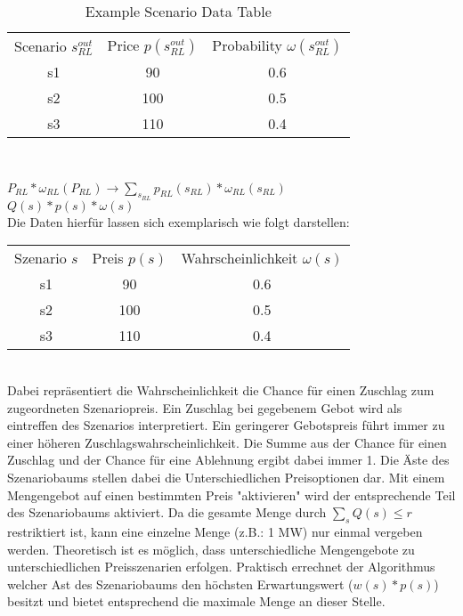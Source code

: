 


\begin{table}
	\begin{tabular}{c|c|c}
		Scenario $s^{out}_{RL}$ & Price $p(s^{out}_{RL})$ & Probability $\omega(s^{out}_{RL})$ \\
		s1                      & 90                      & 0.6                                \\
		s2                      & 100                     & 0.5                                \\
		s3                      & 110                     & 0.4                                \\
	\end{tabular}\\
	\label{tab:example_scenario}
	\caption{Example Scenario Data Table}
\end{table}

$P_{RL} * \omega_{RL}(P_{RL}) \rightarrow \sum_{s_{RL}} p_{RL}(s_{RL}) * \omega_{RL}(s_{RL})$\\



$Q(s) * p(s) * \omega(s)$\\
Die Daten hierfür lassen sich exemplarisch wie folgt darstellen:\\
\begin{tabular}{c|c|c}
	Szenario $s$ & Preis $p(s)$ & Wahrscheinlichkeit $\omega(s)$ \\
	s1           & 90           & 0.6                            \\
	s2           & 100          & 0.5                            \\
	s3           & 110          & 0.4                            \\
\end{tabular}\\


Dabei repräsentiert die Wahrscheinlichkeit die Chance für einen Zuschlag zum zugeordneten Szenariopreis. Ein Zuschlag bei gegebenem Gebot wird als eintreffen des Szenarios interpretiert. Ein geringerer Gebotspreis führt immer zu einer höheren Zuschlagswahrscheinlichkeit. Die Summe aus der Chance für einen Zuschlag und der Chance für eine Ablehnung ergibt dabei immer 1. Die Äste des Szenariobaums stellen dabei die Unterschiedlichen Preisoptionen dar. Mit einem Mengengebot auf einen bestimmten Preis "aktivieren" wird der entsprechende Teil des Szenariobaums aktiviert. Da die gesamte Menge durch $\sum_s Q(s) \leq r$  restriktiert ist, kann eine einzelne Menge (z.B.: 1 MW) nur einmal vergeben werden. Theoretisch ist es möglich, dass unterschiedliche Mengengebote zu unterschiedlichen Preisszenarien erfolgen. Praktisch errechnet der Algorithmus welcher Ast des Szenariobaums den höchsten Erwartungswert ($w(s)*p(s)$) besitzt und bietet entsprechend die maximale Menge an dieser Stelle. \\


